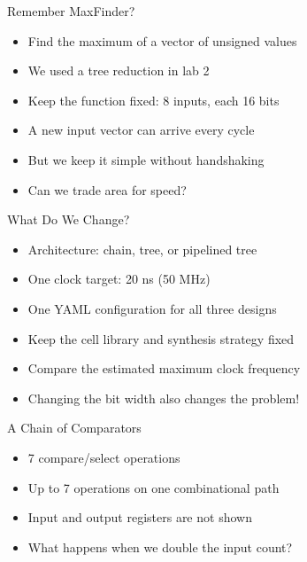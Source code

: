 \begin{frame}{Remember MaxFinder?}
\begin{itemize}
\item Find the maximum of a vector of unsigned values
\item We used a tree reduction in lab 2
\item Keep the function fixed: 8 inputs, each 16 bits
\item A new input vector can arrive every cycle
\item But we keep it simple without handshaking
\item Can we trade area for speed?
\end{itemize}
\end{frame}

\begin{frame}{What Do We Change?}
\begin{itemize}
\item Architecture: chain, tree, or pipelined tree
\item One clock target: 20 ns (50 MHz)
\item One YAML configuration for all three designs
\item Keep the cell library and synthesis strategy fixed
\item Compare the estimated maximum clock frequency
\item Changing the bit width also changes the problem!
\end{itemize}
\end{frame}


\begin{frame}{A Chain of Comparators}

\begin{center}
\end{center}
\begin{itemize}
\item 7 compare/select operations
\item Up to 7 operations on one combinational path
\item Input and output registers are not shown
\item What happens when we double the input count?
\end{itemize}
\end{frame}

